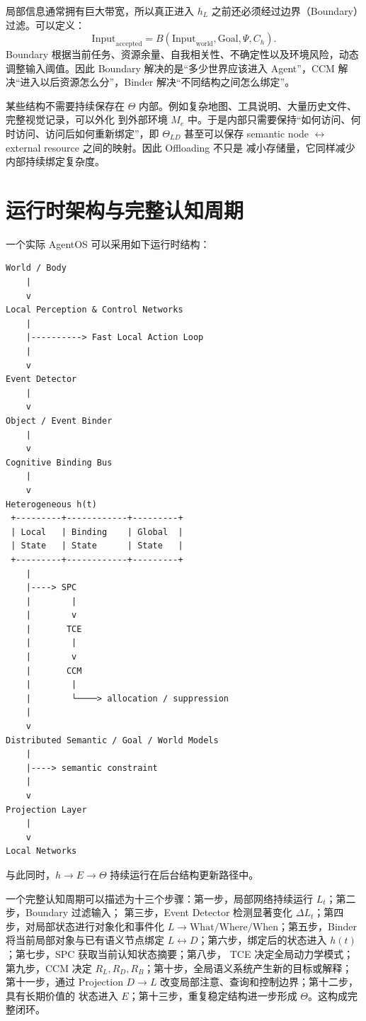 局部信息通常拥有巨大带宽，所以真正进入 $h_L$ 之前还必须经过边界（Boundary）过滤。可以定义：
\[
\mathrm{Input}_{\mathrm{accepted}}
=
B(\mathrm{Input}_{\mathrm{world}},\mathrm{Goal},\Psi,C_h).
\]
Boundary 根据当前任务、资源余量、自我相关性、不确定性以及环境风险，动态调整输入阈值。因此 Boundary
解决的是“多少世界应该进入 Agent”，CCM 解决“进入以后资源怎么分”，Binder 解决“不同结构之间怎么绑定”。

某些结构不需要持续保存在 $\Theta$ 内部。例如复杂地图、工具说明、大量历史文件、完整视觉记录，可以外化
到外部环境 $M_e$ 中。于是内部只需要保持“如何访问、何时访问、访问后如何重新绑定”，即 $\Theta_{LD}$
甚至可以保存 semantic node $\leftrightarrow$ external resource 之间的映射。因此 Offloading 不只是
减小存储量，它同样减少内部持续绑定复杂度。

\section{运行时架构与完整认知周期}

一个实际 AgentOS 可以采用如下运行时结构：

\begin{verbatim}
World / Body
    |
    v
Local Perception & Control Networks
    |
    |----------> Fast Local Action Loop
    |
    v
Event Detector
    |
    v
Object / Event Binder
    |
    v
Cognitive Binding Bus
    |
    v
Heterogeneous h(t)
 +---------+------------+---------+
 | Local   | Binding    | Global  |
 | State   | State      | State   |
 +---------+------------+---------+
    |
    |----> SPC
    |        |
    |        v
    |       TCE
    |        |
    |        v
    |       CCM
    |        |
    |        └────> allocation / suppression
    |
    v
Distributed Semantic / Goal / World Models
    |
    |----> semantic constraint
    |
    v
Projection Layer
    |
    v
Local Networks
\end{verbatim}

与此同时，$h\rightarrow E\rightarrow\Theta$ 持续运行在后台结构更新路径中。

一个完整认知周期可以描述为十三个步骤：第一步，局部网络持续运行 $L_t$；第二步，Boundary 过滤输入；
第三步，Event Detector 检测显著变化 $\Delta L_t$；第四步，对局部状态进行对象化和事件化
$L\rightarrow\mathrm{What/Where/When}$；第五步，Binder 将当前局部对象与已有语义节点绑定
$L\leftrightarrow D$；第六步，绑定后的状态进入 $h(t)$；第七步，SPC 获取当前认知状态摘要；第八步，
TCE 决定全局动力学模式；第九步，CCM 决定 $R_L,R_D,R_B$；第十步，全局语义系统产生新的目标或解释；
第十一步，通过 Projection $D\rightarrow L$ 改变局部注意、查询和控制边界；第十二步，具有长期价值的
状态进入 $E$；第十三步，重复稳定结构进一步形成 $\Theta$。这构成完整闭环。

